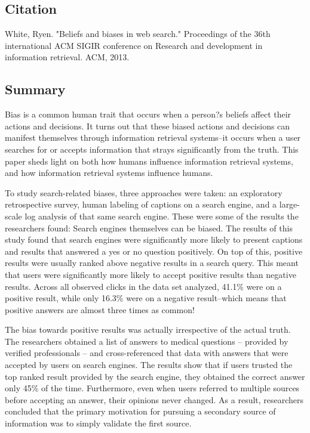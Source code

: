 \documentclass[../summaries.tex]{subfiles}
\begin{document}
\subsection{Citation}
White, Ryen. "Beliefs and biases in web search." Proceedings of the 36th international ACM SIGIR conference on Research and development in information retrieval. ACM, 2013.

\subsection{Summary}
Bias is a common human trait that occurs when a person?s beliefs affect their actions and decisions. It turns out that these biased actions and decisions can manifest themselves through information retrieval systems--it occurs when a user searches for or accepts information that strays significantly from the truth. This paper sheds light on both how humans influence information retrieval systems, and how information retrieval systems influence humans.

To study search-related biases, three approaches were taken: an exploratory retrospective survey, human labeling of captions on a search engine, and a large-scale log analysis of that same search engine. These were some of the results the researchers found:
Search engines themselves can be biased. The results of this study found that search engines were significantly more likely to present captions and results that answered a yes or no question positively. On top of this, positive results were usually ranked above negative results in a search query. This meant that users were significantly more likely to accept positive results than negative results. Across all observed clicks in the data set analyzed, 41.1\% were on a positive result, while only 16.3\% were on a negative result--which means that positive answers are almost three times as common!

The bias towards positive results was actually irrespective of the actual truth. The researchers obtained a list of answers to medical questions -- provided by verified professionals -- and cross-referenced that data with answers that were accepted by users on search engines. The results show that if users trusted the top ranked result provided by the search engine, they obtained the correct answer only 45\% of the time. Furthermore, even when users referred to multiple sources before accepting an answer, their opinions never changed. As a result, researchers concluded that the primary motivation for pursuing a secondary source of information was to simply validate the first source.
\end{document}

